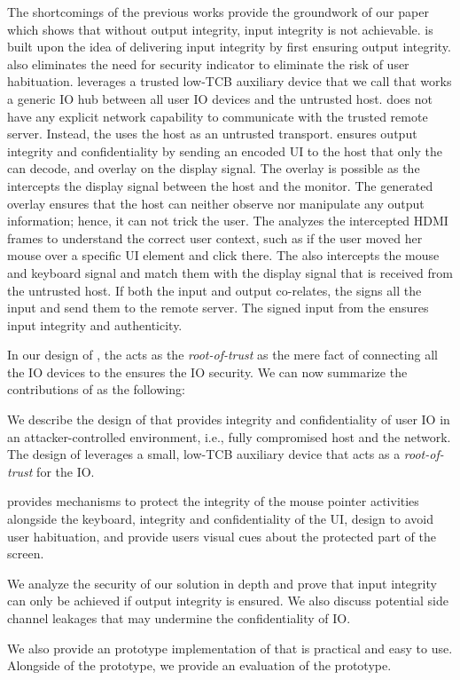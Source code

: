  
 The shortcomings of the previous works provide the groundwork of our paper which shows that without output integrity, input integrity is not achievable. \name is built upon the idea of delivering input integrity by first ensuring output integrity. \name also eliminates the need for security indicator to eliminate the risk of user habituation. \name leverages a trusted low-TCB auxiliary device that we call \device that works a generic IO hub between all user IO devices and the untrusted host. \device does not have any explicit network capability to communicate with the trusted remote server. Instead, the \device uses the host as an untrusted transport. \device ensures output integrity and confidentiality by sending an encoded UI to the host that only the \device can decode, and overlay on the display signal. The overlay is possible as the \device intercepts the display signal between the host and the monitor. The \device generated overlay ensures that the host can neither observe nor manipulate any output information; hence, it can not trick the user. The \device analyzes the intercepted HDMI frames to understand the correct user context, such as if the user moved her mouse over a specific UI element and click there. The \device also intercepts the mouse and keyboard signal and match them with the display signal that is received from the untrusted host. If both the input and output co-relates, the \device signs all the input and send them to the remote server. The signed input from the \device ensures input integrity and authenticity. 

In our design of \name, the \device acts as the \emph{root-of-trust} as the mere fact of connecting all the IO devices to the \device ensures the IO security. We can now summarize the contributions of \name as the following: 

\begin{mybullet}
  \item We describe the design of \name that provides integrity and confidentiality of user IO in an attacker-controlled environment, i.e., fully compromised host and the network. The design of \name leverages a small, low-TCB auxiliary device that acts as a \emph{root-of-trust} for the IO.
  \item \name provides mechanisms to protect the integrity of the mouse pointer activities alongside the keyboard, integrity and confidentiality of the UI, design to avoid user habituation, and provide users visual cues about the protected part of the screen. 
  \item We analyze the security of our solution in depth and prove that input integrity can only be achieved if output integrity is ensured. We also discuss potential side channel leakages that may undermine the confidentiality of IO. 
  \item We also provide an prototype implementation of \name that is practical and easy to use. Alongside of the prototype, we provide an evaluation of the prototype.
\end{mybullet}

